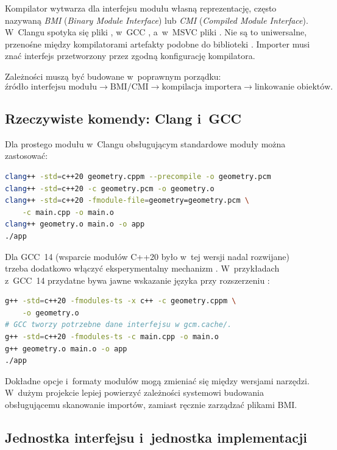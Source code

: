 Kompilator wytwarza dla interfejsu modułu własną reprezentację,
często nazywaną \emph{BMI} (\emph{Binary Module Interface}) lub
\emph{CMI} (\emph{Compiled Module Interface}). W~Clangu spotyka się
pliki , w~GCC , a~w~MSVC pliki .
Nie są to uniwersalne, przenośne między kompilatorami artefakty
podobne do biblioteki . Importer musi znać interfejs
przetworzony przez zgodną konfigurację kompilatora.

Zależności muszą być budowane w~poprawnym porządku:
\[
\text{źródło interfejsu modułu}
\longrightarrow \text{BMI/CMI}
\longrightarrow \text{kompilacja importera}
\longrightarrow \text{linkowanie obiektów}.
\]

\subsection{Rzeczywiste komendy: Clang i~GCC}

Dla prostego modułu  w~Clangu obsługującym
standardowe moduły można zastosować:
\begin{lstlisting}[language=bash,caption={Budowanie przykładowego modułu w Clangu (tryb BMI).}]
clang++ -std=c++20 geometry.cppm --precompile -o geometry.pcm
clang++ -std=c++20 -c geometry.pcm -o geometry.o
clang++ -std=c++20 -fmodule-file=geometry=geometry.pcm \
    -c main.cpp -o main.o
clang++ geometry.o main.o -o app
./app
\end{lstlisting}

Dla GCC~14 (wsparcie modułów C++20 było w~tej wersji nadal rozwijane)
trzeba dodatkowo włączyć eksperymentalny mechanizm
. W~przykładach z~GCC~14 przydatne bywa jawne
wskazanie języka przy rozszerzeniu \code{.cppm}:
\begin{lstlisting}[language=bash,caption={Budowanie tego samego modułu z GCC 14.}]
g++ -std=c++20 -fmodules-ts -x c++ -c geometry.cppm \
    -o geometry.o
# GCC tworzy potrzebne dane interfejsu w gcm.cache/.
g++ -std=c++20 -fmodules-ts -c main.cpp -o main.o
g++ geometry.o main.o -o app
./app
\end{lstlisting}

Dokładne opcje i~formaty modułów mogą zmieniać się między wersjami
narzędzi. W~dużym projekcie lepiej powierzyć zależności systemowi
budowania obsługującemu skanowanie importów, zamiast ręcznie
zarządzać plikami BMI.

\subsection{Jednostka interfejsu i~jednostka implementacji}

